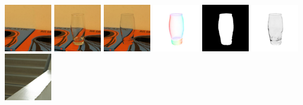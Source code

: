 \\
    \includegraphics[width=0.155\textwidth]{ch-tomnet/images/Limitation/natural_23_023_IMG_4999crop_0_ref.jpg}
    \includegraphics[width=0.155\textwidth]{ch-tomnet/images/Limitation/natural_23_023_IMG_4999crop_7_tar.jpg}
    \includegraphics[width=0.155\textwidth]{ch-tomnet/images/Limitation/natural_23_023_IMG_4999crop_5_final_r.jpg}
    \includegraphics[width=0.155\textwidth]{ch-tomnet/images/Limitation/natural_23_023_IMG_4999crop_1_fcolor_r.jpg}
    \includegraphics[width=0.155\textwidth]{ch-tomnet/images/Limitation/natural_23_023_IMG_4999crop_3_mask_r.jpg}
    \includegraphics[width=0.155\textwidth]{ch-tomnet/images/Limitation/natural_23_023_IMG_4999crop_4_rho_r.jpg}
\\
    \includegraphics[width=0.155\textwidth]{ch-tomnet/images/Limitation/natural_23_023_IMG_5052crop_0_ref.jpg}
